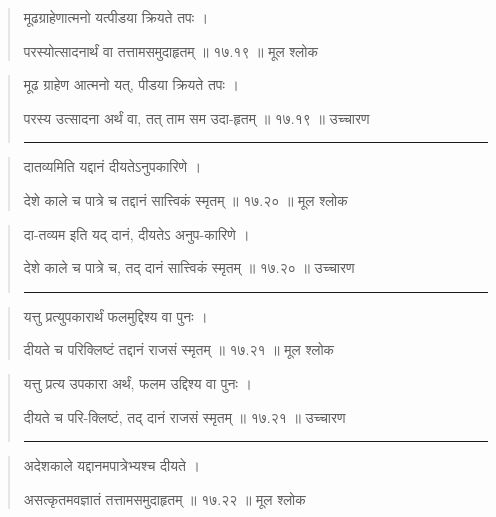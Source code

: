 \begin{quotation}

मूढग्राहेणात्मनो यत्पीडया क्रियते तपः ।  

परस्योत्सादनार्थं वा तत्तामसमुदाहृतम्‌  ॥ १७.१९ ॥  मूल श्लोक
\end{quotation}

\begin{quotation}

मूढ ग्राहेण आत्मनो यत्, पीडया क्रियते तपः ।  

परस्य उत्सादना अर्थं वा, तत् ताम सम उदा-हृतम्‌  ॥ १७.१९ ॥  उच्चारण

\noindent\rule{16cm}{0.4pt} 
\end{quotation}


\begin{quotation}

दातव्यमिति यद्दानं दीयतेऽनुपकारिणे ।  

देशे काले च पात्रे च तद्दानं सात्त्विकं स्मृतम्‌  ॥ १७.२० ॥  मूल श्लोक
\end{quotation}

\begin{quotation}

दा-तव्यम इति यद् दानं, दीयतेऽ अनुप-कारिणे ।  

देशे काले च पात्रे च, तद् दानं सात्त्विकं स्मृतम्‌  ॥ १७.२० ॥  उच्चारण

\noindent\rule{16cm}{0.4pt} 
\end{quotation}


\begin{quotation}

यत्तु प्रत्युपकारार्थं फलमुद्दिश्य वा पुनः ।  

दीयते च परिक्लिष्टं तद्दानं राजसं स्मृतम्‌  ॥ १७.२१ ॥  मूल श्लोक
\end{quotation}

\begin{quotation}

यत्तु प्रत्य उपकारा अर्थं, फलम उद्दिश्य वा पुनः ।  

दीयते च परि-क्लिष्टं, तद् दानं राजसं स्मृतम्‌  ॥ १७.२१ ॥  उच्चारण

\noindent\rule{16cm}{0.4pt} 
\end{quotation}


\begin{quotation}

अदेशकाले यद्दानमपात्रेभ्यश्च दीयते ।  

असत्कृतमवज्ञातं तत्तामसमुदाहृतम्‌  ॥ १७.२२ ॥  मूल श्लोक
\end{quotation}

